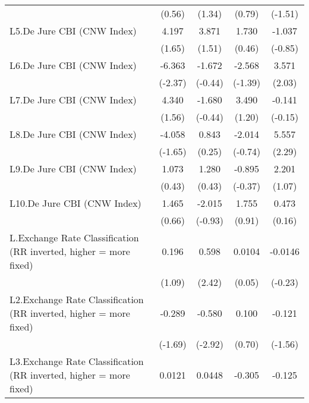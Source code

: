 {\begin{longtable}{l*{4}{c}}
                &   (0.56)         &   (1.34)         &   (0.79)         &  (-1.51)         \\
\addlinespace
L5.De Jure CBI (CNW Index)&    4.197         &    3.871         &    1.730         &   -1.037         \\
                &   (1.65)         &   (1.51)         &   (0.46)         &  (-0.85)         \\
\addlinespace
L6.De Jure CBI (CNW Index)&   -6.363\sym{*}  &   -1.672         &   -2.568         &    3.571\sym{*}  \\
                &  (-2.37)         &  (-0.44)         &  (-1.39)         &   (2.03)         \\
\addlinespace
L7.De Jure CBI (CNW Index)&    4.340         &   -1.680         &    3.490         &   -0.141         \\
                &   (1.56)         &  (-0.44)         &   (1.20)         &  (-0.15)         \\
\addlinespace
L8.De Jure CBI (CNW Index)&   -4.058         &    0.843         &   -2.014         &    5.557\sym{*}  \\
                &  (-1.65)         &   (0.25)         &  (-0.74)         &   (2.29)         \\
\addlinespace
L9.De Jure CBI (CNW Index)&    1.073         &    1.280         &   -0.895         &    2.201         \\
                &   (0.43)         &   (0.43)         &  (-0.37)         &   (1.07)         \\
\addlinespace
L10.De Jure CBI (CNW Index)&    1.465         &   -2.015         &    1.755         &    0.473         \\
                &   (0.66)         &  (-0.93)         &   (0.91)         &   (0.16)         \\
\addlinespace
L.Exchange Rate Classification (RR inverted, higher = more fixed)&    0.196         &    0.598\sym{*}  &   0.0104         &  -0.0146         \\
                &   (1.09)         &   (2.42)         &   (0.05)         &  (-0.23)         \\
\addlinespace
L2.Exchange Rate Classification (RR inverted, higher = more fixed)&   -0.289         &   -0.580\sym{**} &    0.100         &   -0.121         \\
                &  (-1.69)         &  (-2.92)         &   (0.70)         &  (-1.56)         \\
\addlinespace
L3.Exchange Rate Classification (RR inverted, higher = more fixed)&   0.0121         &   0.0448         &   -0.305\sym{*}  &   -0.125         \\

\end{longtable}}
